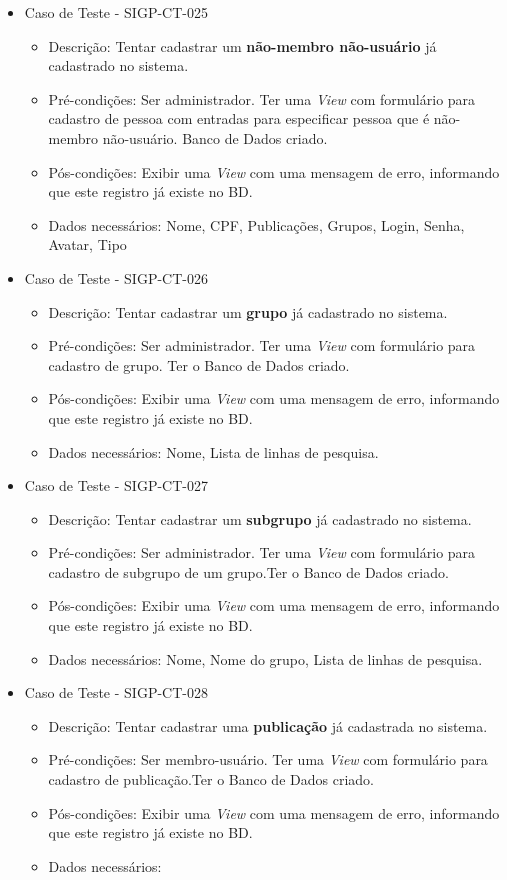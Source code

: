 \documentclass[11pt, a4paper]{book}
\begin{document}
\begin{itemize}
	\item Caso de Teste - SIGP-CT-025
	\begin{itemize}
	\item Descrição: Tentar cadastrar um \textbf{não-membro não-usuário} já cadastrado no sistema.
	\item Pré-condições: Ser administrador. Ter uma \emph{View} com formulário para cadastro de pessoa com entradas para especificar pessoa que é não-membro não-usuário. Banco de Dados criado.
	\item Pós-condições: Exibir uma \emph{View} com uma mensagem de erro, informando que este registro já existe no BD.
	\item Dados necessários:  Nome, CPF, Publicações, Grupos, Login, Senha, Avatar, Tipo
	\end{itemize}

	\item Caso de Teste - SIGP-CT-026
	\begin{itemize}
	\item Descrição: Tentar cadastrar um \textbf{grupo} já cadastrado no sistema.
	\item Pré-condições: Ser administrador. Ter uma \emph{View} com formulário para cadastro de grupo. Ter o Banco de Dados criado.
	\item Pós-condições: Exibir uma \emph{View} com uma mensagem de erro, informando que este registro já existe no BD.
	\item Dados necessários: Nome, Lista de linhas de pesquisa.
	\end{itemize}

	\item Caso de Teste - SIGP-CT-027
	\begin{itemize}
	\item Descrição: Tentar cadastrar um \textbf{subgrupo} já cadastrado no sistema.
	\item Pré-condições: Ser administrador. Ter uma \emph{View} com formulário para cadastro de subgrupo de um grupo.Ter o Banco de Dados criado.
	\item Pós-condições: Exibir uma \emph{View} com uma mensagem de erro, informando que este registro já existe no BD.
	\item Dados necessários: Nome, Nome do grupo, Lista de linhas de pesquisa.
	\end{itemize}

\newpage

	\item Caso de Teste - SIGP-CT-028
	\begin{itemize}
	\item Descrição: Tentar cadastrar uma \textbf{publicação} já cadastrada no sistema.
	\item Pré-condições: Ser membro-usuário. Ter uma \emph{View} com formulário para cadastro de publicação.Ter o Banco de Dados criado.
	\item Pós-condições: Exibir uma \emph{View} com uma mensagem de erro, informando que este registro já existe no BD.
	\item Dados necessários: 
	\end{itemize}


\end{itemize}
\end{document}

